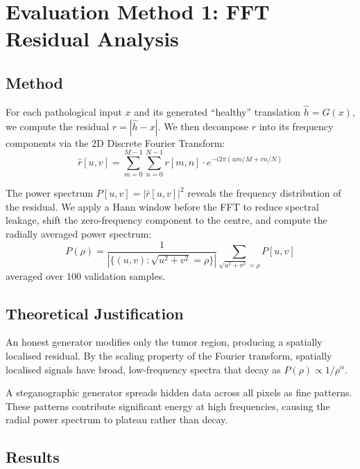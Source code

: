 \documentclass[11pt,a4paper]{article}
\theoremstyle{definition}
\begin{document}
\section{Evaluation Method 1: FFT Residual Analysis}
\label{sec:fft}

\subsection{Method}

For each pathological input $x$ and its generated ``healthy'' translation $\hat{h} = G(x)$, we compute the residual $r = |\hat{h} - x|$. We then decompose $r$ into its frequency components via the 2D Discrete Fourier Transform:
\begin{equation}
    \hat{r}[u,v] = \sum_{m=0}^{M-1} \sum_{n=0}^{N-1} r[m,n] \cdot e^{-i2\pi(um/M + vn/N)}
\end{equation}

The power spectrum $P[u,v] = |\hat{r}[u,v]|^2$ reveals the frequency distribution of the residual. We apply a Hann window before the FFT to reduce spectral leakage, shift the zero-frequency component to the centre, and compute the radially averaged power spectrum:
\begin{equation}
    P(\rho) = \frac{1}{|\{(u,v) : \sqrt{u^2+v^2} = \rho\}|} \sum_{\sqrt{u^2+v^2} = \rho} P[u,v]
\end{equation}
averaged over 100 validation samples.

\subsection{Theoretical Justification}

An honest generator modifies only the tumor region, producing a spatially localised residual. By the scaling property of the Fourier transform, spatially localised signals have broad, low-frequency spectra that decay as $P(\rho) \propto 1/\rho^\alpha$.

A steganographic generator spreads hidden data across all pixels as fine patterns. These patterns contribute significant energy at high frequencies, causing the radial power spectrum to plateau rather than decay.

\subsection{Results}
\end{document}
